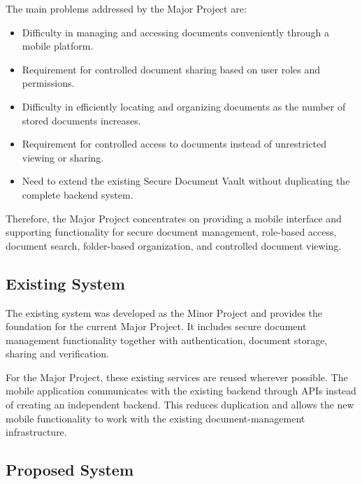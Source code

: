 \documentclass[12pt]{article}
\begin{document}
The main problems addressed by the Major Project are:

\begin{itemize}
    \item Difficulty in managing and accessing documents conveniently through a mobile platform.
    
    \item Requirement for controlled document sharing based on user roles and permissions.
    
    \item Difficulty in efficiently locating and organizing documents as the number of stored documents increases.
    
    \item Requirement for controlled access to documents instead of unrestricted viewing or sharing.
    
    \item Need to extend the existing Secure Document Vault without duplicating the complete backend system.
\end{itemize}

Therefore, the Major Project concentrates on providing a mobile interface and supporting functionality for secure document management, role-based access, document search, folder-based organization, and controlled document viewing.


\subsection{Existing System}

The existing system was developed as the Minor Project and provides the foundation for the current Major Project. It includes secure document management functionality together with authentication, document storage, sharing and verification.

For the Major Project, these existing services are reused wherever possible. The mobile application communicates with the existing backend through APIs instead of creating an independent backend. This reduces duplication and allows the new mobile functionality to work with the existing document-management infrastructure.


\subsection{Proposed System}
\end{document}
